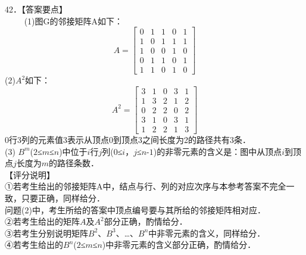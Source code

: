 42．【答案要点】 \\
$\qquad$ (1)图G的邻接矩阵A如下： \\
\begin{equation}
A=
\begin{bmatrix}
 0 & 1 & 1 & 0 & 1 \\
 1 & 0 & 1 & 1 & 1 \\
 1 & 0 & 0 & 1 & 0 \\
 0 & 1 & 1 & 0 & 1 \\
 1 & 1 & 0 & 1 & 0 
\end{bmatrix}
\end{equation}
(2)$A^2$如下：\\
\begin{equation}
A^2=
\begin{bmatrix}
 3 & 1 & 0 & 3 & 1 \\
 1 & 3 & 2 & 1 & 2 \\
 0 & 2 & 2 & 0 & 2 \\
 3 & 1 & 0 & 3 & 1 \\
 1 & 2 & 2 & 1 & 3 
\end{bmatrix}
\end{equation}
0行3列的元素值3表示从顶点0到顶点3之间长度为2的路径共有3条．\\
(3) $B^m$($2$≤$m$≤$n$)中位于$i$行$j$列($0$≤$i$，$j$≤$n$-$1$)的非零元素的含义是：图中从顶点$i$到顶点$j$长度为$m$的路径条数．\\
【评分说明】\\
①若考生给出的邻接矩阵A中，结点与行、列的对应次序与本参考答案不完全一致，只要正确，同样给分．\\
问题(2)中，考生所给的答案中顶点编号要与其所给的邻接矩阵相对应．\\
②若考生给出的矩阵$A$及$A^2$部分正确，酌情给分．\\
③若考生分别说明矩阵$B^2$、$B^3$、…、$B^n$中非零元素的含义，同样给分．\\
④若考生给出的$B^n$($2$≤$m$≤$n$)中非零元素的含义部分正确，酌情给分．


